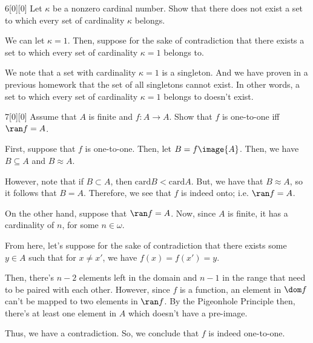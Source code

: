 \documentclass{article}
\begin{document}
\begin{hw}{6}[0][0]
	Let $\kappa$ be a nonzero cardinal number. Show that there does not exist a set to which every set of cardinality $\kappa$ belongs.
\end{hw}
\begin{solution}
	We can let $\kappa = 1$. Then, suppose for the sake of contradiction that there exists a set to which every set of cardinality $\kappa = 1$ belongs to. 
	
	We note that a set with cardinality $\kappa = 1$ is a singleton. And we have proven in a previous homework that the set of all singletons cannot exist. In other words, a set to which every set of cardinality $\kappa = 1$ belongs to doesn't exist.
\end{solution}

\begin{hw}{7}[0][0]
	Assume that $A$ is finite and $f : A \rightarrow A$. Show that $f$ is one-to-one iff $\ran f = A$.
\end{hw}
\begin{solution}
	First, suppose that $f$ is one-to-one. Then, let $B = f\image{A}$. Then, we have $B \subseteq A$ and $B \approx A$.
	
	However, note that if $B \subset A$, then $\mathrm{card} B < \mathrm{card} A$. But, we have that $B \approx A$, so it follows that $B = A$. Therefore, we see that $f$ is indeed onto; i.e. $\ran f = A$.
	
	On the other hand, suppose that $\ran f = A$. Now, since $A$ is finite, it has a cardinality of $n$, for some $n \in \omega$.
	
	From here, let's suppose for the sake of contradiction that there exists some $y \in A$ such that for $x \neq x'$, we have $f(x) = f(x') = y$.
	
	Then, there's $n-2$ elements left in the domain and $n-1$ in the range that need to be paired with each other. However, since $f$ is a function, an element in $\dom f$ can't be mapped to two elements in $\ran f$. By the Pigeonhole Principle then, there's at least one element in $A$ which doesn't have a pre-image.
	
	Thus, we have a contradiction. So, we conclude that $f$ is indeed one-to-one.
\end{solution}
\end{document}
